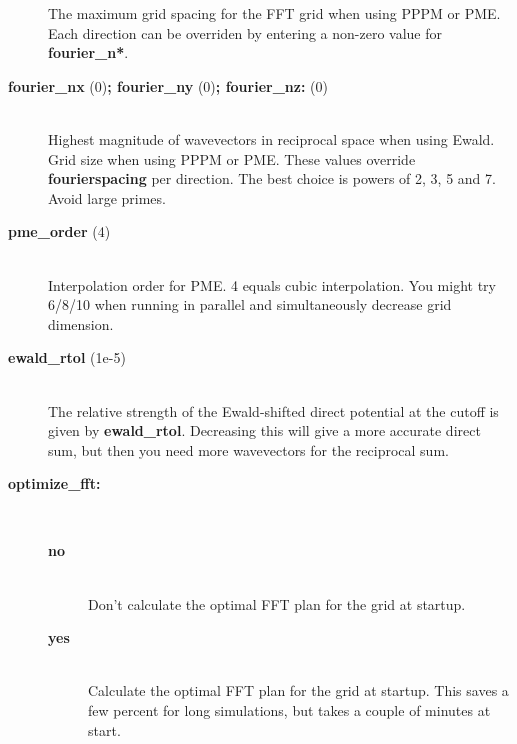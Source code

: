 \begin{description}
The maximum grid spacing for the FFT grid when using PPPM or PME.
Each direction can be overriden by entering a non-zero value for
{\bf fourier\_n*}.
\item[{\bf fourier\_nx }(0){\bf  ; fourier\_ny }(0){\bf  ; fourier\_nz: }(0)]\mbox{}\\
Highest magnitude of wavevectors in reciprocal space when using Ewald.
Grid size when using PPPM or PME. These values override
{\bf fourierspacing} per direction. The best choice is powers of
2, 3, 5 and 7. Avoid large primes.
\item[{\bf pme\_order }(4)]\mbox{}\\
Interpolation order for PME. 4 equals cubic interpolation. You might try
6/8/10 when running in parallel and simultaneously decrease grid dimension.
\item[{\bf ewald\_rtol }(1e-5)]\mbox{}\\
The relative strength of the Ewald-shifted direct potential at the cutoff
is given by {\bf ewald\_rtol}. Decreasing this will give a more accurate
direct sum, but then you need more wavevectors for the reciprocal sum.
\item[{\bf optimize\_fft:}]\mbox{}\\
\vspace{-2ex}\begin{description}
\item[{\bf no}]\mbox{}\\
Don't calculate the optimal FFT plan for the grid at startup.
\item[{\bf yes}]\mbox{}\\
Calculate the optimal FFT plan for the grid at startup. This saves a
few percent for long simulations, but takes a couple of minutes
at start.
\end{description}
\end{description}

